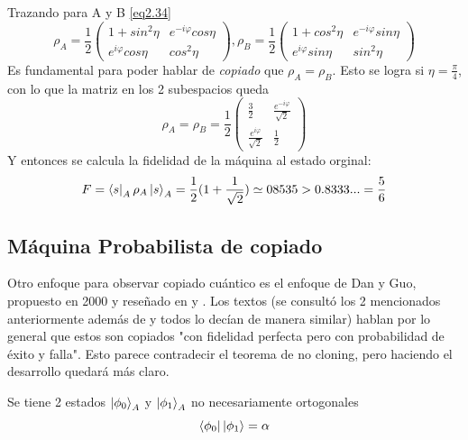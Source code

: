 \documentclass{book}
\begin{document}
Trazando para A y B \ref{eq2.34}
\begin{equation}\label{eq2.35}{\rho_A=\frac{1}{2}\begin{pmatrix}1+sin^2\eta&e^{-i\varphi}cos\eta  \\ e^{i\varphi}cos\eta & cos^2\eta \end{pmatrix}, \rho_B=\frac{1}{2}\begin{pmatrix} 1+cos^2\eta& e^{-i\varphi}sin\eta\\  e^{i\varphi} sin\eta & sin^2 \eta \end{pmatrix}}\end{equation}
Es fundamental para poder hablar de \textit{copiado} que $\rho_A=\rho_B$. Esto se logra si $\eta=\frac{\pi}{4}$, con lo que la matriz en los 2 subespacios queda
\begin{equation}\label{eq2.36}{\rho_A=\rho_B=\frac{1}{2}\begin{pmatrix} \frac{3}{2} & \frac{e^{-i\varphi}}{\sqrt{2}} \\  \frac{e^{i\varphi}}{\sqrt{2}} & \frac{1}{2} \end{pmatrix}}\end{equation}
Y entonces se calcula la fidelidad de la máquina al estado orginal:
\begin{equation}\label{eq2.37}{F=\bra{s}_A\rho_A\ket{s}_A=\frac{1}{2}(1+\frac{1}{\sqrt{2}})\simeq 08535 > 0.8333...=\frac{5}{6}}\end{equation}
\subsection{Máquina Probabilista de copiado}
Otro enfoque para observar copiado cuántico es el enfoque de Dan y Guo, propuesto en 2000 y reseñado en \cite{bib3} y \cite{bib4}. Los textos (se consultó los 2 mencionados anteriormente además de \cite{bib2} y todos lo decían de manera similar) hablan por lo general que estos son copiados "con fidelidad perfecta pero con probabilidad de éxito y falla". Esto parece contradecir el teorema de no cloning, pero haciendo el desarrollo quedará más claro.

Se tiene 2 estados $\ket{\phi_0}_A$ y $\ket{\phi_1}_A$ no necesariamente ortogonales
\begin{equation} \label{eq2.38}{ \bra{\phi_0}\ket{\phi_1} =\alpha }\end{equation}
\end{document}
